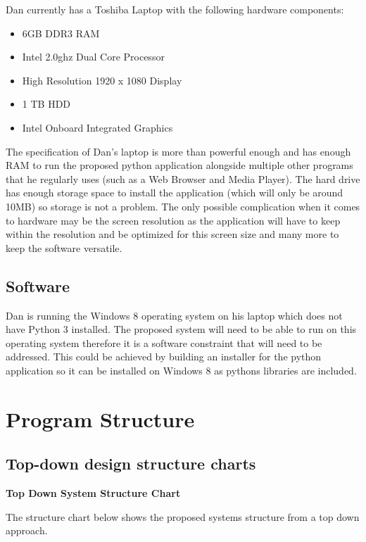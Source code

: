 \begin{flushleft}
	Dan currently has a Toshiba Laptop with the following hardware components:
	
	\begin{itemize}
		\item 6GB DDR3 RAM
		\item Intel 2.0ghz Dual Core Processor
		\item High Resolution 1920 x 1080 Display
		\item 1 TB HDD
		\item Intel Onboard Integrated Graphics
	\end{itemize}

	The specification of Dan's laptop is more than powerful enough and has enough RAM to run the proposed python application alongside multiple other programs that he regularly uses (such as a Web Browser and Media Player). The hard drive has enough storage space to install the application (which will only be around 10MB) so storage is not a problem. The only possible complication when it comes to hardware may be the screen resolution as the application will have to keep within the resolution and be optimized for this screen size and many more to keep the software versatile.
\end{flushleft}

\subsection{Software}

\begin{flushleft}
	Dan is running the Windows 8 operating system on his laptop which does not have Python 3 installed. The proposed system will need to be able to run on this operating system therefore it is a software constraint that will need to be addressed. This could be achieved by building an installer for the python application so it can be installed on Windows 8 as pythons libraries are included.

\end{flushleft}


\pagebreak
\section{Program Structure}
\subsection{Top-down design structure charts}
\textbf{Top Down System Structure Chart}
\begin{flushleft}
The structure chart below shows the proposed systems structure from a top down approach.
\end{flushleft}

